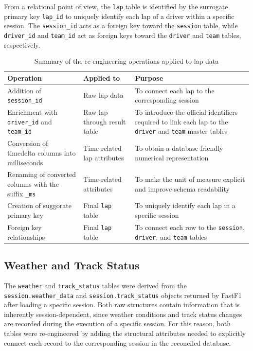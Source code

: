 \documentclass[12pt,a4paper]{article}
\begin{document}
	From a relational point of view, the \texttt{lap} table is identified by the surrogate primary key \texttt{lap\_id} to uniquely identify each lap of a driver within a specific session.
	The \texttt{session\_id} acts as a foreign key toward the \texttt{session} table, while \texttt{driver\_id} and \texttt{team\_id} act as foreign keys toward the \texttt{driver} and \texttt{team} tables, respectively.
	
	\begin{table}[H]
		\centering
		\caption{Summary of the re-engineering operations applied to lap data}
		\renewcommand{\arraystretch}{1.2}
		\begin{tabularx}{\textwidth}{>{\raggedright\arraybackslash}p{4.1cm} >{\raggedright\arraybackslash}p{3.2cm} >{\raggedright\arraybackslash}X}
			\toprule
			\textbf{Operation} & \textbf{Applied to} & \textbf{Purpose} \\
			\midrule
			Addition of \texttt{session\_id} & Raw lap data & To connect each lap to the corresponding session\\
			\addlinespace
			Enrichment with \texttt{driver\_id} and \texttt{team\_id} & Raw lap through result table & To introduce the official identifiers required to link each lap to the \texttt{driver} and \texttt{team} master tables \\
			\addlinespace
			Conversion of timedelta columns into milliseconds & Time-related lap attributes & To obtain a database-friendly numerical representation \\
			\addlinespace
			Renaming of converted columns with the suffix \texttt{\_ms} & Time-related attributes & To make the unit of measure explicit and improve schema readability \\
			\addlinespace
			Creation of suggorate primary key & Final \texttt{lap} table & To uniquely identify each lap in a specific session \\
			\addlinespace
			Foreign key relationships & Final \texttt{lap} table & To connect each row to the \texttt{session}, \texttt{driver}, and \texttt{team} tables \\
			\bottomrule
		\end{tabularx}
	\end{table}
	
	
	\subsection{Weather and Track Status}
	
	The \texttt{weather} and \texttt{track\_status} tables were derived from the \texttt{session.weather\_data} and \texttt{session.track\_status} objects returned by FastF1 after loading a specific session.
	Both raw structures contain information that is inherently session-dependent, since weather conditions and track status changes are recorded during the execution of a specific session.
	For this reason, both tables were re-engineered by adding the structural attributes needed to explicitly connect each record to the corresponding session in the reconciled database.
	
\end{document}
